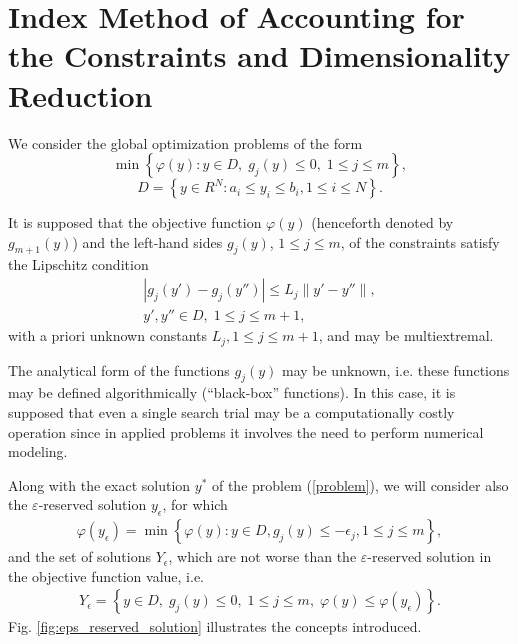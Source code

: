 \documentclass[twocolumn]{svjour3}          %
\begin{document}
\section{Index Method of Accounting for the Constraints and Dimensionality Reduction}
\label{sec:2}
	We consider the global optimization problems of the form
\begin{equation}\label{problem}
	\min{\left\{\varphi(y):y \in D, \; g_j(y)\leq 0, \; 1 \leq j \leq m\right\}},
\end{equation}
\begin{equation}\label{D}
	D=\left\{y\in R^N: a_i\leq y_i \leq b_i, 1\leq i \leq N\right\}.
\end{equation}

	It is supposed that the objective function $\varphi(y)$ (henceforth denoted by $g_{m+1}(y)$) and the left-hand sides $g_{j}(y)$, $1 \leq j \leq m$, of the constraints satisfy the Lipschitz condition
\begin{align}\label{lipschitz_condition}
	\left|g_j(y')-g_j (y'')\right| \leq L_j \|y'-y''\|, \nonumber \\ 
	y', y''\in D, \; 1\leq j \leq m+1,
\end{align}
with a priori unknown constants $L_j, 1\leq j \leq m+1$, and may be multiextremal.

	The analytical form of the functions $g_{j}(y)$ may be unknown, i.e. these functions may be defined algorithmically (“black-box” functions). In this case, it is supposed that even a single search trial may be a computationally costly operation since in applied problems it involves the need to perform numerical modeling. 
	
	Along with the exact solution $y^\ast$ of the problem (\ref{problem}), we will consider also the $\varepsilon$-reserved solution $y_{\epsilon}$, for which 
\small
\begin{align}\label{epsilon_reserved_solution}
	\varphi(y_{\epsilon}) = \min{\left\{\varphi(y):y \in D, g_j(y)\leq -{\epsilon}_j, 1 \leq j \leq m\right\}},
\end{align}
\normalsize
and the set of solutions $Y_{\epsilon}$, which are not worse than the $\varepsilon$-reserved solution in the objective function value, i.e.
\small
\begin{align}\label{Y_epsilon}
	Y_{\epsilon} = \left\{ y \in D, \; g_j(y) \leq 0, \; 1 \leq j \leq m, \; \varphi(y) \leq \varphi(y_{\epsilon}) \right\}.
\end{align}
\normalsize
Fig. \ref{fig:eps_reserved_solution} illustrates the concepts introduced.
\end{document}
